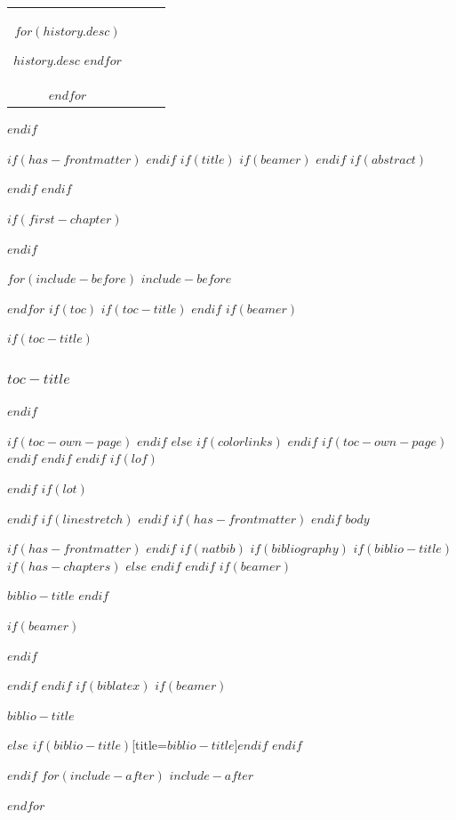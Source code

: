 \documentclass[
$if(fontsize)$
  $fontsize$,
$endif$
$if(papersize)$
  $papersize$paper,
$else$
  paper=a4,
$endif$
$if(beamer)$
  ignorenonframetext,
$if(handout)$
  handout,
$endif$
$if(aspectratio)$
  aspectratio=$aspectratio$,
$endif$
$endif$
$for(classoption)$
  $classoption$$sep$,
$endfor$
  ,captions=tableheading    %
]{$if(beamer)$$documentclass$$else$$if(book)$scrbook$else$scrartcl$endif$$endif$}
\newif\ifbibliography
\begin{document}
\begin{longtable}[]{@{}cccl@{}}
\begin{minipage}[t]{0.43\columnwidth}
                                                                   $for(history.desc)$

                                                                   $history.desc$
                                                                   $endfor$\strut
                                                           \end{minipage}\tabularnewline
        $endfor$

        \bottomrule
\end{longtable}

\newpage
\setlength{\parindent}{2em}
$endif$




$if(has-frontmatter)$
\frontmatter
$endif$
$if(title)$
$if(beamer)$
\frame{\titlepage}
$endif$
$if(abstract)$
\begin{abstract}
$abstract$
\end{abstract}
$endif$
$endif$

$if(first-chapter)$
\setcounter{chapter}{$first-chapter$}
\addtocounter{chapter}{-1}
$endif$

$for(include-before)$
$include-before$

$endfor$
$if(toc)$
$if(toc-title)$
\renewcommand*\contentsname{$toc-title$}
$endif$
$if(beamer)$
\begin{frame}[allowframebreaks]
$if(toc-title)$
  \frametitle{$toc-title$}
$endif$
  \tableofcontents[hideallsubsections]
\end{frame}
$if(toc-own-page)$
\newpage
$endif$
$else$
{
$if(colorlinks)$
\hypersetup{linkcolor=$if(toccolor)$$toccolor$$else$$endif$}
$endif$
\setcounter{tocdepth}{$toc-depth$}
\tableofcontents
$if(toc-own-page)$
\newpage
$endif$
}
$endif$
$endif$
$if(lof)$
\listoffigures
$endif$
$if(lot)$
\listoftables
$endif$
$if(linestretch)$
$endif$
$if(has-frontmatter)$
\mainmatter
$endif$
$body$

$if(has-frontmatter)$
\backmatter
$endif$
$if(natbib)$
$if(bibliography)$
$if(biblio-title)$
$if(has-chapters)$
\renewcommand\bibname{$biblio-title$}
$else$
\renewcommand\refname{$biblio-title$}
$endif$
$endif$
$if(beamer)$
\begin{frame}[allowframebreaks]{$biblio-title$}
  \bibliographytrue
$endif$
  
$if(beamer)$
\end{frame}
$endif$

$endif$
$endif$
$if(biblatex)$
$if(beamer)$
\begin{frame}[allowframebreaks]{$biblio-title$}
  \bibliographytrue
  \printbibliography[heading=none]
\end{frame}
$else$
\printbibliography$if(biblio-title)$[title=$biblio-title$]$endif$
$endif$

$endif$
$for(include-after)$
$include-after$

$endfor$
\end{document}

